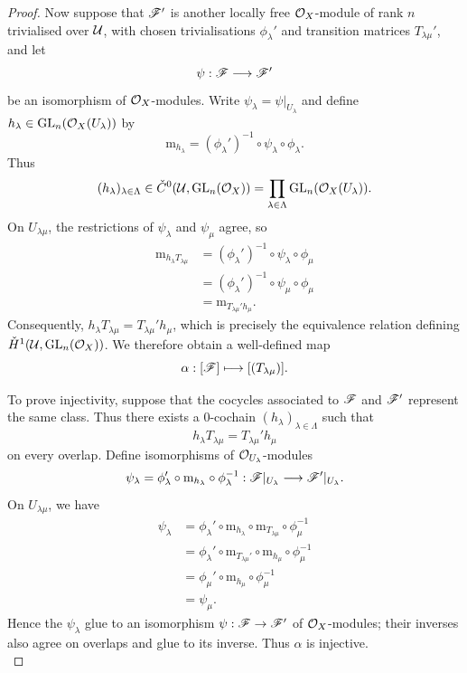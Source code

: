 \documentclass[12pt,a4paper]{article}
\begin{document}
\begin{proof}
    Now suppose that $\mathscr{F}'$ is another locally free
    $\mathcal{O}_X$-module of rank $n$ trivialised over $\mathcal{U}$,
    with chosen trivialisations $\phi_\lambda'$ and
    transition matrices $T_{\lambda\mu}'$, and let
    \[
        \psi:\mathscr{F}\longrightarrow\mathscr{F}'
    \]
    be an isomorphism of $\mathcal{O}_X$-modules.
    Write $\psi_\lambda=\psi|_{U_\lambda}$ and define $h_\lambda\in\operatorname{GL}_n(\mathcal{O}_X(U_\lambda))$ by
    \[
        \mathrm m_{h_\lambda}
        =
        (\phi_\lambda')^{-1}
        \circ\psi_\lambda\circ\phi_\lambda.
    \]
    Thus
    \[
        (h_\lambda)_{\lambda\in\Lambda}
        \in
        \check C^0(\mathcal{U},\operatorname{GL}_n(\mathcal{O}_X))
        =
        \prod_{\lambda\in\Lambda}
        \operatorname{GL}_n(\mathcal{O}_X(U_\lambda)).
    \]
    On $U_{\lambda\mu}$, the restrictions of $\psi_\lambda$
    and $\psi_\mu$ agree, so
    \begin{align*}
        \mathrm m_{h_\lambda T_{\lambda\mu}}
        &=
        (\phi_\lambda')^{-1}
        \circ\psi_\lambda\circ\phi_\mu\\
        &=
        (\phi_\lambda')^{-1}
        \circ\psi_\mu\circ\phi_\mu\\
        &=
        \mathrm m_{T_{\lambda\mu}'h_\mu}.
    \end{align*}
    Consequently, $h_\lambda T_{\lambda\mu}=T_{\lambda\mu}'h_\mu$, which is precisely the equivalence relation defining
    $\check H^1(\mathcal{U},\operatorname{GL}_n(\mathcal{O}_X))$. We therefore obtain a well-defined map
    \[
        \alpha:[\mathscr{F}]\longmapsto[(T_{\lambda\mu})].
    \]

    To prove injectivity, suppose that the cocycles associated
    to $\mathscr{F}$ and $\mathscr{F}'$ represent the same class. Thus there
    exists a $0$-cochain $(h_\lambda)_{\lambda\in\Lambda}$ such that
    \[
        h_\lambda T_{\lambda\mu}
        =
        T_{\lambda\mu}'h_\mu
    \]
    on every overlap. Define isomorphisms of
    $\mathcal{O}_{U_\lambda}$-modules
    \[
        \psi_\lambda
        =
        \phi_\lambda'\circ\mathrm m_{h_\lambda}
        \circ\phi_\lambda^{-1}:
        \mathscr{F}|_{U_\lambda}\longrightarrow\mathscr{F}'|_{U_\lambda}.
    \]
    On $U_{\lambda\mu}$, we have
    \begin{align*}
        \psi_\lambda
        &=
        \phi_\lambda'\circ\mathrm m_{h_\lambda}
        \circ\mathrm m_{T_{\lambda\mu}}
        \circ\phi_\mu^{-1}\\
        &=
        \phi_\lambda'\circ\mathrm m_{T_{\lambda\mu}'}
        \circ\mathrm m_{h_\mu}\circ\phi_\mu^{-1}\\
        &=
        \phi_\mu'\circ\mathrm m_{h_\mu}\circ\phi_\mu^{-1}\\
        &=
        \psi_\mu.
    \end{align*}
    Hence the $\psi_\lambda$ glue to an isomorphism
    $\psi:\mathscr{F}\to\mathscr{F}'$ of $\mathcal{O}_X$-modules; their inverses
    also agree on overlaps and glue to its inverse.
    Thus $\alpha$ is injective.\\


\end{proof}
\end{document}
